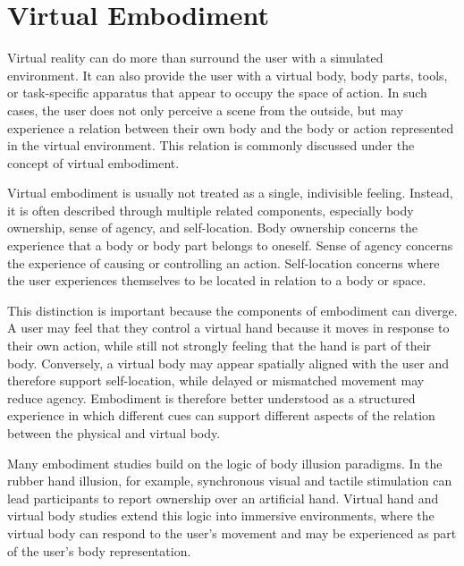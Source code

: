 \section{Virtual Embodiment}
\label{sec:background_virtual_embodiment}

Virtual reality can do more than surround the user with a simulated environment. It can also provide the user with a virtual body, body parts, tools, or task-specific apparatus that appear to occupy the space of action. In such cases, the user does not only perceive a scene from the outside, but may experience a relation between their own body and the body or action represented in the virtual environment. This relation is commonly discussed under the concept of virtual embodiment.

Virtual embodiment is usually not treated as a single, indivisible feeling. Instead, it is often described through multiple related components, especially body ownership, sense of agency, and self-location. Body ownership concerns the experience that a body or body part belongs to oneself. Sense of agency concerns the experience of causing or controlling an action. Self-location concerns where the user experiences themselves to be located in relation to a body or space.

This distinction is important because the components of embodiment can diverge. A user may feel that they control a virtual hand because it moves in response to their own action, while still not strongly feeling that the hand is part of their body. Conversely, a virtual body may appear spatially aligned with the user and therefore support self-location, while delayed or mismatched movement may reduce agency. Embodiment is therefore better understood as a structured experience in which different cues can support different aspects of the relation between the physical and virtual body.

Many embodiment studies build on the logic of body illusion paradigms. In the rubber hand illusion, for example, synchronous visual and tactile stimulation can lead participants to report ownership over an artificial hand. Virtual hand and virtual body studies extend this logic into immersive environments, where the virtual body can respond to the user's movement and may be experienced as part of the user's body representation.

